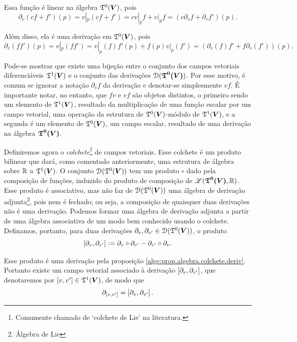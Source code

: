 Essa função é linear na álgebra $\mathfrak{T}^0(\bm V)$, pois
	\begin{equation*}
	\partial_v(cf+f')(p) = v|_p(cf+f') = cv|_p f + v|_p f = (c\partial_v f + \partial_v f')(p).
	\end{equation*}

Além disso, ela é uma derivação em $\mathfrak{T}^0(\bm V)$, pois
	\begin{equation*}
	\partial_v(ff')(p) = v|_p(ff') = v|_p(f)f'(p) + f(p) v|_p(f') = (\partial_v(f)f'+f\partial_v(f'))(p).
	\end{equation*}

Pode-se mostrar que existe uma bijeção entre o conjunto dos campos vetoriais diferenciáveis $\mathfrak{T}^1(\bm V)$ e o conjunto das derivações $\mathcal{D}(\bm{\mathfrak{T}^0(\bm V)})$. Por esse motivo, é comum se ignorar a notação $\partial_v f$ da derivação e denotar-se simplesmente $vf$. É importante notar, no entanto, que $fv$ e $vf$ são objetos distintos, o primeiro sendo um elemento de $\mathfrak{T}^1(\bm V)$, resultado da multiplicação de uma função escalar por um campo vetorial, uma operação da estrutura de $\mathfrak{T}^0(\bm V)$-módulo de $\mathfrak{T}^1(\bm V)$, e a segunda é um elemento de $\mathfrak{T}^0(\bm V)$, um campo escalar, resultado de uma derivação na álgebra $\bm{\mathfrak{T}^0(\bm V)}$.

Definiremos agora o \textit{colchete}\footnote{Comumente chamado de `colchete de Lie' na literatura.} de campos vetoriais. Esse colchete é um produto bilinear que dará, como comentado anteriormente, uma estrutura de álgebra sobre $\mathbb{R}$ a $\mathfrak{T}^1(\bm V)$. O conjunto $\mathcal{D}(\mathfrak{T}^0(\bm V))$ tem um produto $\circ$ dado pela composição de funções, induzido do produto de composição de $\mathscr{L}(\bm{\mathfrak{T}^0(\bm V)},\mathbb{R})$. Esse produto é associativo, mas não faz de $\mathcal{D}(\mathfrak{T}^0(\bm V))$ uma álgebra de derivação adjunta\footnote{Álgebra de Lie}, pois nem é fechado; ou seja, a composição de quaisquer duas derivações não é uma derivação. Podemos formar uma álgebra de derivação adjunta a partir de uma álgebra associativa de um modo bem conhecido usando o colchete. Definamos, portanto, para duas derivações $\partial_v,\partial_{v'} \in \mathcal{D}(\mathfrak{T}^0(\bm V))$, o produto
	\begin{equation*}
	\left[{\partial_v},{\partial_{v'}}\right] := \partial_v \circ \partial_{v'} - \partial_{v'} \circ \partial_v.
	\end{equation*}

Esse produto é uma derivação pela proposição \ref{alge:prop.algebra.colchete.deriv}. Portanto existe um campo vetorial associado à derivação $\left[{\partial_v},{\partial_{v'}}\right]$, que denotaremos por $\left[{v},{v'}\right] \in \mathfrak{T}^1(\bm V)$, de modo que
	\begin{equation*}
	\partial_{\left[{v},{v'}\right]} = \left[{\partial_v},{\partial_{v'}}\right].
	\end{equation*}


